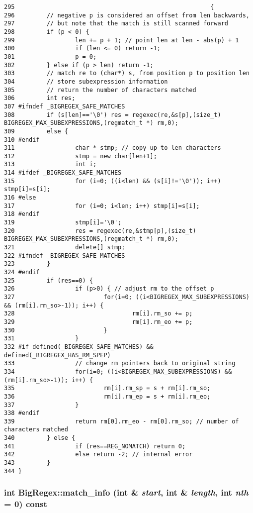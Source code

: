 \footnotesize\begin{verbatim}295                                                       {
296         // negative p is considered an offset from len backwards,
297         // but note that the match is still scanned forward
298         if (p < 0) {
299                 len += p + 1; // point len at len - abs(p) + 1
300                 if (len <= 0) return -1;
301                 p = 0;
302         } else if (p > len) return -1;
303         // match re to (char*) s, from position p to position len
304         // store subexpression information
305         // return the number of characters matched
306         int res;
307 #ifndef _BIGREGEX_SAFE_MATCHES
308         if (s[len]=='\0') res = regexec(re,&s[p],(size_t) BIGREGEX_MAX_SUBEXPRESSIONS,(regmatch_t *) rm,0);
309         else {
310 #endif
311                 char * stmp; // copy up to len characters
312                 stmp = new char[len+1];
313                 int i;
314 #ifdef _BIGREGEX_SAFE_MATCHES
315                 for (i=0; ((i<len) && (s[i]!='\0')); i++) stmp[i]=s[i];
316 #else
317                 for (i=0; i<len; i++) stmp[i]=s[i];
318 #endif
319                 stmp[i]='\0';
320                 res = regexec(re,&stmp[p],(size_t) BIGREGEX_MAX_SUBEXPRESSIONS,(regmatch_t *) rm,0);
321                 delete[] stmp;
322 #ifndef _BIGREGEX_SAFE_MATCHES
323         }
324 #endif
325         if (res==0) {
326                 if (p>0) { // adjust rm to the offset p
327                         for(i=0; ((i<BIGREGEX_MAX_SUBEXPRESSIONS) && (rm[i].rm_so>-1)); i++) {
328                                 rm[i].rm_so += p;
329                                 rm[i].rm_eo += p;
330                         }
331                 }
332 #if defined(_BIGREGEX_SAFE_MATCHES) && defined(_BIGREGEX_HAS_RM_SPEP)
333                 // change rm pointers back to original string
334                 for(i=0; ((i<BIGREGEX_MAX_SUBEXPRESSIONS) && (rm[i].rm_so>-1)); i++) {
335                         rm[i].rm_sp = s + rm[i].rm_so;
336                         rm[i].rm_ep = s + rm[i].rm_eo;
337                 }
338 #endif
339                 return rm[0].rm_eo - rm[0].rm_so; // number of characters matched
340         } else {
341                 if (res==REG_NOMATCH) return 0;
342                 else return -2; // internal error
343         }
344 }
\end{verbatim}\normalsize 
{}
\subsubsection{\setlength{\rightskip}{0pt plus 5cm}int Big\-Regex::match\_\-info (int \& {\em start}, int \& {\em length}, int {\em nth} = 0) const}\label{classBigRegex_a4}




